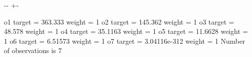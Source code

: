 \documentclass[a4paper,10pt,english]{sphinxmanual}
\newlength\nbsphinxcodecellspacing
\begin{document}
{

\kern-\sphinxverbatimsmallskipamount\kern-\baselineskip
\kern+\FrameHeightAdjust\kern-\fboxrule
\vspace{\nbsphinxcodecellspacing}

\begin{sphinxVerbatim}[commandchars=\\\{\}]
o1         target =         363.333 weight =               1
o2         target =         145.362 weight =               1
o3         target =          48.578 weight =               1
o4         target =         35.1163 weight =               1
o5         target =         11.6628 weight =               1
o6         target =         6.51573 weight =               1
o7         target =    3.04116e-312 weight =               1
Number of observations is 7
\end{sphinxVerbatim}
}
\end{document}
